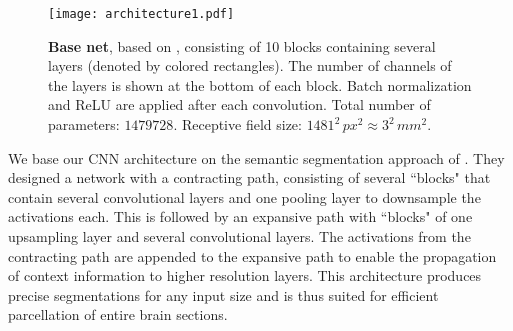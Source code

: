 \documentclass{article}
\begin{document}
\begin{figure}[t]
	\texttt{[image: architecture1.pdf]}
	\caption{
		\textbf{Base net}, based on \cite{ronneberger2015}, consisting of 10 blocks containing several layers (denoted by colored rectangles). 
		The number of channels of the layers is shown at the bottom of each block. 
		Batch normalization and ReLU are applied after each convolution.
		Total number of parameters: $1479728$. Receptive field size: $1481^2\,px^2 \approx 3^2\,mm^2$. 
	}
	\label{fig:arch}
\end{figure}
%
We base our CNN architecture on the semantic segmentation approach of \cite{ronneberger2015}. 
They designed a network with a contracting path, consisting of several ``blocks" that contain several convolutional layers and one pooling layer to downsample the activations each. 
This is followed by an expansive path with ``blocks" of one upsampling layer and several convolutional layers.
The activations from the contracting path are appended to the expansive path to enable the propagation of context information to higher resolution layers. 
This architecture produces precise segmentations for any input size and is thus suited for efficient parcellation of entire brain sections. %
\end{document}
